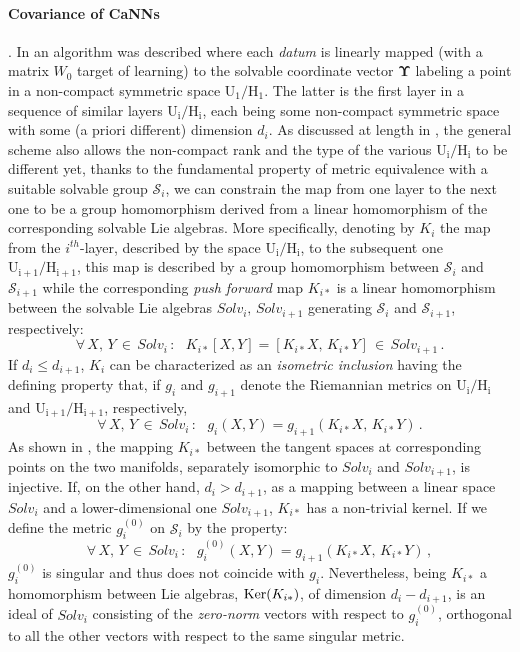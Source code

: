 \documentclass[10pt,a4paper]{article}
\begin{document}
\paragraph{Covariance of CaNNs}. In \cite{TSnaviga} an algorithm
was described where each \textit{datum} is linearly mapped (with a matrix $W_0$ target of learning) to the solvable coordinate vector $\boldsymbol{\Upsilon}$ labeling a point in a non-compact symmetric space $\mathrm{U_1/H_1}$. The latter is the first layer in a sequence of similar layers $\mathrm{U_i/H_i}$,
each being some non-compact symmetric space with some (a priori different) dimension $d_i$.
As discussed at length in \cite{TSnaviga}, the general scheme also allows the non-compact rank and the type of the various $\mathrm{U_i/H_i}$ to be different yet, thanks to the fundamental property of metric equivalence with a suitable solvable group $\mathcal{S}_i$, we can constrain the map from one layer to the next one to be a group homomorphism derived from a linear homomorphism of the corresponding solvable Lie algebras. More specifically, denoting by $K_i$ the map from the  $i^{th}$-layer, described by the space $\mathrm{U_i/H_i}$, to the subsequent one $\mathrm{U_{i+1}/H_{i+1}}$, this map is  described by a group homomorphism between $\mathcal{S}_i$ and $\mathcal{S}_{i+1}$ while the corresponding \emph{push forward} map $K_{i*}$ is a linear homomorphism between the solvable Lie algebras $Solv_i,\,Solv_{i+1}$ generating $\mathcal{S}_i$ and  $\mathcal{S}_{i+1}$, respectively:
$$\forall\,X,\,Y\,\in\, Solv_i\,:\,\,\,\,K_{i*}[X,Y]=[K_{i*}X,\,K_{i*}Y]\,\in \,Solv_{i+1}\,.$$
If $d_i\le d_{i+1}$, $K_i$ can be characterized as an \emph{isometric inclusion} \cite{KN1} having the defining property  that, if $g_i$ and $g_{i+1}$ denote the Riemannian metrics on  $\mathrm{U_i/H_i}$ and  $\mathrm{U_{i+1}/H_{i+1}}$, respectively,
$$\forall\,X,\,Y\,\in\, Solv_i\,:\,\,\,\,g_i(X,Y)=g_{i+1}(K_{i*}X,\,K_{i*}Y)\,.$$
As shown in \cite{KN1}, the mapping $K_{i*}$ between the tangent spaces at corresponding points on the two manifolds, separately isomorphic to $Solv_i$ and $Solv_{i+1}$, is injective. If, on the other hand, $d_i>d_{i+1}$, as a mapping between a linear space $Solv_i$ and a lower-dimensional one  $Solv_{i+1}$, $K_{i*}$ has a non-trivial kernel. If we define the metric $g_i^{(0)}$ on $\mathcal{S}_i$ by the property:
$$\forall\,X,\,Y\,\in\, Solv_i\,:\,\,\,\,g_i^{(0)}(X,Y)=g_{i+1}(K_{i*}X,\,K_{i*}Y)\,,$$
 $g_i^{(0)}$ is singular and thus does not coincide with $g_i$. Nevertheless, being $K_{i*}$  a homomorphism between Lie algebras, ${\rm Ker}(K_{i*})$, of dimension $d_{i}-d_{i+1}$, is an ideal of $Solv_i$ consisting of the \emph{zero-norm} vectors with respect to $g_i^{(0)}$, orthogonal to all the other vectors with respect to the same singular metric.
\end{document}
